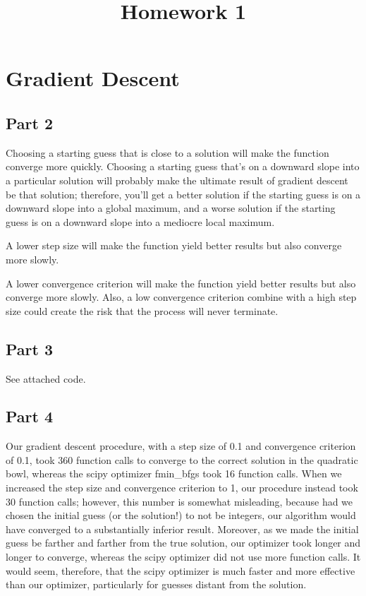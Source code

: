 \documentclass{sigchi}
\begin{document}
\title{Homework 1}


\maketitle

\section{Gradient Descent}


\subsection{Part 2}

Choosing a starting guess that is close to a solution will make the function converge more quickly. Choosing a starting guess that's on a downward slope into a particular solution will probably make the ultimate result of gradient descent be that solution; therefore, you'll get a better solution if the starting guess is on a downward slope into a global maximum, and a worse solution if the starting guess is on a downward slope into a mediocre local maximum.

A lower step size will make the function yield better results but also converge more slowly.

A lower convergence criterion will make the function yield better results but also converge more slowly. Also, a low convergence criterion combine with a high step size could create the risk that the process will never terminate.

\subsection{Part 3}

See attached code.

\subsection{Part 4}

Our gradient descent procedure, with a step size of 0.1 and convergence criterion of 0.1, took 360 function calls to converge to the correct solution in the quadratic bowl, whereas the scipy optimizer fmin\_bfgs took 16 function calls. When we increased the step size and convergence criterion to 1, our procedure instead took 30 function calls; however, this number is somewhat misleading, because had we chosen the initial guess (or the solution!) to not be integers, our algorithm would have converged to a substantially inferior result. Moreover, as we made the initial guess be farther and farther from the true solution, our optimizer took longer and longer to converge, whereas the scipy optimizer did not use more function calls. It would seem, therefore, that the scipy optimizer is much faster and more effective than our optimizer, particularly for guesses distant from the solution.
\end{document}
